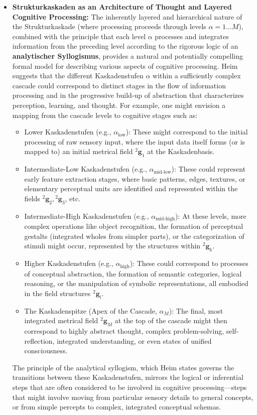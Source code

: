\documentclass[12pt]{article}
\newcommand{\kompositionsfeld}{{}^2\mathbf{g}}
\newcommand{\kaskadenstufe}{\alpha}
\begin{document}
\begin{itemize}
    \item \textbf{Strukturkaskaden as an Architecture of Thought and Layered Cognitive Processing:}
    The inherently layered and hierarchical nature of the Strukturkaskade (where processing proceeds through levels \( \kaskadenstufe=1 \dots M \)), combined with the principle that each level \( \kaskadenstufe \) processes and integrates information from the preceding level according to the rigorous logic of an \textbf{analytischer Syllogismus}, provides a natural and potentially compelling formal model for describing various aspects of cognitive processing. Heim suggests that the different Kaskadenstufen \( \kaskadenstufe \) within a sufficiently complex cascade could correspond to distinct stages in the flow of information processing and in the progressive build-up of abstraction that characterizes perception, learning, and thought. For example, one might envision a mapping from the cascade levels to cognitive stages such as:
    \begin{itemize}
        \item Lower Kaskadenstufen (e.g., \( \kaskadenstufe_{\text{low}} \)): These might correspond to the initial processing of raw sensory input, where the input data itself forms (or is mapped to) an initial metrical field \( \kompositionsfeld_1 \) at the Kaskadenbasis.
        \item Intermediate-Low Kaskadenstufen (e.g., \( \kaskadenstufe_{\text{mid-low}} \)): These could represent early feature extraction stages, where basic patterns, edges, textures, or elementary perceptual units are identified and represented within the fields \( \kompositionsfeld_2, \kompositionsfeld_3 \), etc.
        \item Intermediate-High Kaskadenstufen (e.g., \( \kaskadenstufe_{\text{mid-high}} \)): At these levels, more complex operations like object recognition, the formation of perceptual gestalts (integrated wholes from simpler parts), or the categorization of stimuli might occur, represented by the structures within \( \kompositionsfeld_k \).
        \item Higher Kaskadenstufen (e.g., \( \kaskadenstufe_{\text{high}} \)): These could correspond to processes of conceptual abstraction, the formation of semantic categories, logical reasoning, or the manipulation of symbolic representations, all embodied in the field structures \( \kompositionsfeld_l \).
        \item The Kaskadenspitze (Apex of the Cascade, \( \kaskadenstufe_M \)): The final, most integrated metrical field \( \kompositionsfeld_M \) at the top of the cascade might then correspond to highly abstract thought, complex problem-solving, self-reflection, integrated understanding, or even states of unified consciousness.
    \end{itemize}
    The principle of the analytical syllogism, which Heim states governs the transitions between these Kaskadenstufen, mirrors the logical or inferential steps that are often considered to be involved in cognitive processing—steps that might involve moving from particular sensory details to general concepts, or from simple percepts to complex, integrated conceptual schemas.


\end{itemize}
\end{document}
